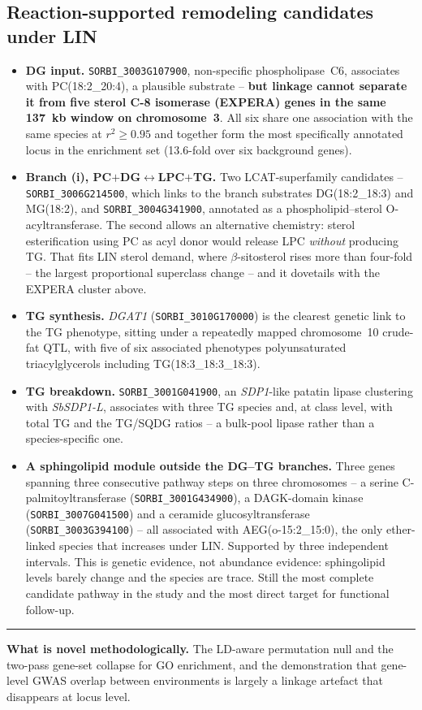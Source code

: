 \documentclass[11pt]{article}
\newcommand{\lead}[1]{\textbf{#1}}
\begin{document}
\subsection{Reaction-supported remodeling candidates under LIN}
\begin{itemize}
  \item \lead{DG input.} \texttt{SORBI\_3003G107900}, non-specific phospholipase~C6,
        associates with PC(18:2\_20:4), a plausible substrate --
        \lead{but linkage cannot separate it from five sterol C-8 isomerase
        (EXPERA) genes in the same 137~kb window on chromosome~3}. All six share
        one association with the same species at $r^2\ge0.95$ and together form
        the most specifically annotated locus in the enrichment set (13.6-fold
        over six background genes).
  \item \lead{Branch (i), PC$+$DG$\leftrightarrow$LPC$+$TG.} Two LCAT-superfamily
        candidates -- \texttt{SORBI\_3006G214500}, which links to the branch
        substrates DG(18:2\_18:3) and MG(18:2), and
        \texttt{SORBI\_3004G341900}, annotated as a phospholipid--sterol
        O-acyltransferase. The second allows an alternative chemistry: sterol
        esterification using PC as acyl donor would release LPC \emph{without}
        producing TG. That fits LIN sterol demand, where $\beta$-sitosterol rises
        more than four-fold -- the largest proportional superclass change -- and
        it dovetails with the EXPERA cluster above.
  \item \lead{TG synthesis.} \textit{DGAT1} (\texttt{SORBI\_3010G170000}) is the
        clearest genetic link to the TG phenotype, sitting under a repeatedly
        mapped chromosome~10 crude-fat QTL, with five of six associated phenotypes
        polyunsaturated triacylglycerols including TG(18:3\_18:3\_18:3).
  \item \lead{TG breakdown.} \texttt{SORBI\_3001G041900}, an \textit{SDP1}-like
        patatin lipase clustering with \textit{SbSDP1-L}, associates with three TG
        species and, at class level, with total TG and the TG/SQDG ratios --
        a bulk-pool lipase rather than a species-specific one.
  \item \lead{A sphingolipid module outside the DG--TG branches.} Three genes
        spanning three consecutive pathway steps on three chromosomes -- a serine
        C-palmitoyltransferase (\texttt{SORBI\_3001G434900}), a DAGK-domain kinase
        (\texttt{SORBI\_3007G041500}) and a ceramide glucosyltransferase
        (\texttt{SORBI\_3003G394100}) -- all associated with AEG(o-15:2\_15:0),
        the only ether-linked species that increases under LIN. Supported by
        three independent intervals. This is genetic evidence, not abundance
        evidence: sphingolipid levels barely change and the species are trace.
        Still the most complete candidate pathway in the study and the most
        direct target for functional follow-up.
\end{itemize}
\vspace{8pt}
\hrule
\vspace{6pt}

\noindent\textbf{What is novel methodologically.} The LD-aware permutation null
and the two-pass gene-set collapse for GO enrichment, and the demonstration that
gene-level GWAS overlap between environments is largely a linkage artefact that
disappears at locus level.
\end{document}
